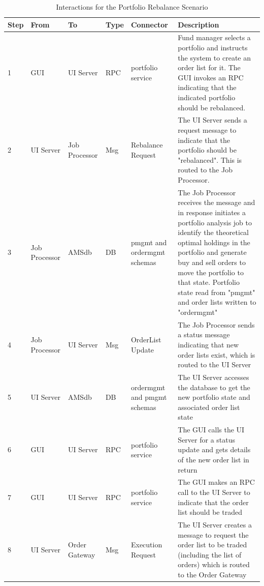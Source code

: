 \begin{table}
\caption{Interactions for the Portfolio Rebalance Scenario}
\label{table:amsinteractions}
\footnotesize
\begin{tabular}{| p{0.5cm} p{2cm} p{2cm} l p{2cm} p{4.9cm} |}
\hline
Step & From & To & Type & Connector & Description \\
\hline

1 & GUI & UI Server & RPC & portfolio service & Fund manager selects a portfolio and instructs the system to create an order list for it.  The GUI invokes an RPC indicating that the indicated portfolio should be rebalanced. \\

2 & UI Server & Job Processor & Msg & Rebalance Request & The UI Server sends a request message to indicate that the portfolio should be "rebalanced".  This is routed to the Job Processor. \\

3 & Job Processor & AMSdb & DB & pmgmt and ordermgmt schemas & The Job Processor receives the message and in response initiates a portfolio analysis job to identify the theoretical optimal holdings in the portfolio and generate buy and sell orders to move the portfolio to that state.  Portfolio state read from "pmgmt" and order lists written to "ordermgmt" \\

4 & Job Processor & UI Server & Msg & OrderList Update & The Job Processor sends a status message indicating that new order lists exist, which is routed to the UI Server \\

5 & UI Server & AMSdb & DB & ordermgmt and pmgmt schemas & The UI Server accesses the database to get the new portfolio state and associated order list state \\

6 & GUI & UI Server & RPC & portfolio service & The GUI calls the UI Server for a status update and gets details of the new order list in return \\

7 & GUI & UI Server & RPC & portfolio service & The GUI makes an RPC call to the UI Server to indicate that the order list should be traded \\

8 & UI Server & Order Gateway & Msg & Execution Request & The UI Server creates a message to request the order list to be traded (including the list of orders) which is routed to the Order Gateway \\


\end{tabular}
\end{table}
